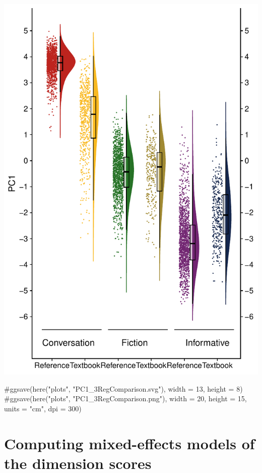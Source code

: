 \documentclass[
  letterpaper,
  DIV=11,
  numbers=noendperiod]{scrreprt}
\newenvironment{Shaded}{\begin{snugshade}}{\end{snugshade}}
\newcommand{\CommentTok}[1]{\textcolor[rgb]{0.37,0.37,0.37}{#1}}
\begin{document}
\includegraphics{G_Ch7_Analysis_files/figure-pdf/rainplots-1.pdf}

\begin{Shaded}
\begin{Highlighting}[]
\CommentTok{\#ggsave(here("plots", "PC1\_3RegComparison.svg"), width = 13, height = 8)}
\CommentTok{\#ggsave(here("plots", "PC1\_3RegComparison.png"), width = 20, height = 15, units = "cm", dpi = 300)}
\end{Highlighting}
\end{Shaded}

\section{Computing mixed-effects models of the dimension
scores}\label{computing-mixed-effects-models-of-the-dimension-scores-1}
\end{document}
